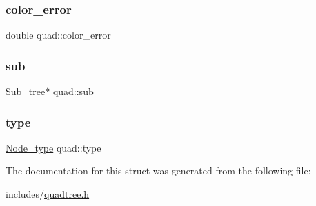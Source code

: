 \subsubsection{\texorpdfstring{color\+\_\+error}{color\_error}}
{\footnotesize\ttfamily double quad\+::color\+\_\+error}

\mbox{\label{structquad_ac804ea0472312bf6c9191cf863e07ad3}} 
\subsubsection{\texorpdfstring{sub}{sub}}
{\footnotesize\ttfamily \hyperlink{unionSub__tree}{Sub\+\_\+tree}$\ast$ quad\+::sub}

\mbox{\label{structquad_a4c74e17073371714f09bfd5777ce1cc9}} 
\subsubsection{\texorpdfstring{type}{type}}
{\footnotesize\ttfamily \hyperlink{quadtree_8h_a4bafb4a83e1da39fd7547ca43cff608d}{Node\+\_\+type} quad\+::type}



The documentation for this struct was generated from the following file\+:\begin{DoxyCompactItemize}
\item 
includes/\hyperlink{quadtree_8h}{quadtree.\+h}\end{DoxyCompactItemize}
